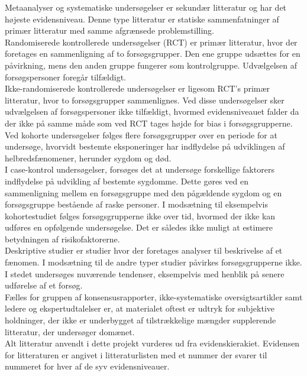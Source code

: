 Metaanalyser og systematiske undersøgelser er sekundær litteratur og har det højeste evidensniveau. Denne type litteratur er statiske sammenfatninger af primær litteratur med samme afgrænsede problemstilling. \citep{denstoredanske2009} \\
Randomiserede kontrollerede undersøgelser (RCT) er primær litteratur, hvor der foretages en sammenligning af to forsøgsgrupper. Den ene gruppe udsættes for en påvirkning, mens den anden gruppe fungerer som kontrolgruppe. Udvælgelsen af forsøgspersoner foregår tilfældigt. \citep{denstoredanske2009a} \\
Ikke-randomiserede kontrollerede undersøgelser er ligesom RCT’s primær litteratur, hvor to forsøgsgrupper sammenlignes. Ved disse undersøgelser sker udvælgelsen af forsøgspersoner ikke tilfældigt, hvormed evidensniveauet falder da der ikke på samme måde som ved RCT tages højde for bias i forsøgsgrupperne. \citep{denstoredanske2009a} \\
Ved kohorte undersøgelser følges flere forsøgsgrupper over en periode for at undersøge, hvorvidt bestemte eksponeringer har indflydelse på udviklingen af helbredsfænomener, herunder sygdom og død. \citep{metodehaandbogen} \\
I case-kontrol undersøgelser, forsøges det at undersøge forskellige faktorers indflydelse på udvikling af bestemte sygdomme. Dette gøres ved en sammenligning mellem en forsøgsgruppe med den pågældende sygdom og en forsøgsgruppe bestående af raske personer. I modsætning til eksempelvis kohortestudiet følges forsøgsgrupperne ikke over tid, hvormed der ikke kan udføres en opfølgende undersøgelse. Det er således ikke muligt at estimere betydningen af  risikofaktorerne. \citep{denstoredanske2012} \\
Deskriptive studier er studier hvor der foretages analyser til beskrivelse af et fænomen. I modsætning til de andre typer studier påvirkes forsøgsgrupperne ikke. I stedet undersøges nuværende tendenser, eksempelvis med henblik på senere udførelse af et forsøg. \citep{} \\
Fælles for gruppen af konsensusrapporter, ikke-systematiske oversigtsartikler samt ledere og ekspertudtalelser er, at materialet oftest er udtryk for subjektive holdninger, der ikke er underbygget af tilstrækkelige mængder supplerende litteratur, der undersøger domænet. \citep{metodehaandbogen} \\
Alt litteratur anvendt i dette projekt vurderes ud fra evidenskierakiet. Evidensen for litteraturen er angivet i litteraturlisten med et nummer der svarer til nummeret for hver af de syv evidensniveauer.   